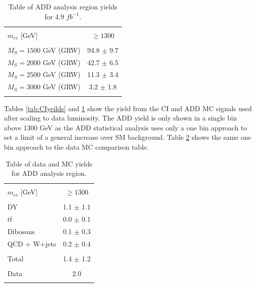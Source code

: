 	\begin{table}[h!]
	\centering %
	\begin{tabular}{l c} %
	\hline\hline \\[-2ex] %
	$m_{ee}$ [GeV] & $\geq 1300$ \\  [0.2ex]
	\hline  \\[-2ex] %
	$M_{S} = 1500$ GeV (GRW) & 94.8 $\pm$ 9.7 \\ 
	$M_{S} = 2000$ GeV (GRW) & 42.7 $\pm$ 6.5 \\ 
	$M_{S} = 2500$ GeV (GRW) & 11.3 $\pm$ 3.4 \\ 
	$M_{S} = 3000$ GeV (GRW) & 3.2 $\pm$ 1.8 \\ 
	\hline\hline  \\ %
	\end{tabular}
	\caption{Table of ADD analysis region yields for 4.9 $fb^{-1}$.} %
	\label{tab:ADDyeilds}
	\end{table}


	Tables \ref{tab:CIyeilds} and \ref{tab:ADDyeilds} show the yield from the CI and ADD MC signals used after scaling to data luminosity. The ADD yield is only shown in a single bin above 1300 GeV as the ADD statistical analysis uses only a one bin approach to set a limit of a general increase over SM background. Table \ref{tab:dataMCADDyeilds} shows the same one bin approach to the data MC comparison table.

	\begin{table}[h!]
	\centering %
	\begin{tabular}{l c} %
	\hline\hline \\[-2ex] %
	$m_{ee}$ [GeV] & $\geq 1300$ \\  [0.2ex]
	\hline  \\[-2ex] %
	DY & 1.1 $\pm$ 1.1 \\ 
	$t\bar{t}$ & 0.0 $\pm$ 0.1 \\ 
	Dibosons & 0.1 $\pm$ 0.3 \\ 
	QCD + W+jets & 0.2 $\pm$ 0.4 \\ 
	\hline  \\[-2ex] %
	Total & 1.4 $\pm$ 1.2 \\ 
	\hline  \\[-2ex] %
	Data & 2.0 \\ 
	\hline\hline  \\ %
	\end{tabular}
	\caption{Table of data and MC yields for ADD analysis region.} %
	\label{tab:dataMCADDyeilds}
	\end{table}



